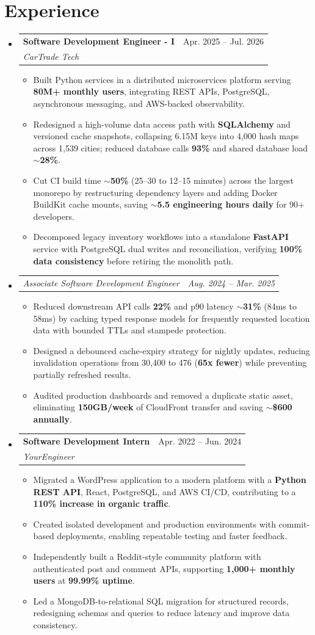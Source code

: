\documentclass[letterpaper,11pt]{article}
\makeatletter
\newcommand{\resumeItem}[1]{
  \item\small{
    {#1 \vspace{-2pt}}
  }
}
\newcommand{\resumeSubheading}[4]{
  \vspace{-2pt}\item
    \begin{tabular*}{0.97\textwidth}[t]{l@{\extracolsep{\fill}}r}
      \textbf{#1} & #2 \\
      \textit{\small#3} & \textit{\small #4} \\
    \end{tabular*}\vspace{-7pt}
}
\newcommand{\resumeSubSubheading}[2]{
    \item
    \begin{tabular*}{0.97\textwidth}{l@{\extracolsep{\fill}}r}
      \textit{\small#1} & \textit{\small #2} \\
    \end{tabular*}\vspace{-7pt}
}
\newcommand{\resumeSubHeadingListStart}{\begin{itemize}[leftmargin=0.15in, label={}]}
\newcommand{\resumeSubHeadingListEnd}{\end{itemize}}
\newcommand{\resumeItemListStart}{\begin{itemize}}
\newcommand{\resumeItemListEnd}{\end{itemize}\vspace{-5pt}}
\makeatother
\begin{document}
\section{Experience}
\resumeSubHeadingListStart
\resumeSubheading
{Software Development Engineer - I}{Apr. 2025 -- Jul. 2026}
{CarTrade Tech}{ }
\resumeItemListStart
\resumeItem{Built Python services in a distributed microservices platform serving \textbf{80M+ monthly users}, integrating REST APIs, PostgreSQL, asynchronous messaging, and AWS-backed observability.}
\resumeItem{Redesigned a high-volume data access path with \textbf{SQLAlchemy} and versioned cache snapshots, collapsing 6.15M keys into 4,000 hash maps across 1,539 cities; reduced database calls \textbf{93\%} and shared database load \textbf{$\sim$28\%}.}
\resumeItem{Cut CI build time \textbf{$\sim$50\%} (25--30 to 12--15 minutes) across the largest monorepo by restructuring dependency layers and adding Docker BuildKit cache mounts, saving \textbf{$\sim$5.5 engineering hours daily} for 90+ developers.}
\resumeItem{Decomposed legacy inventory workflows into a standalone \textbf{FastAPI} service with PostgreSQL dual writes and reconciliation, verifying \textbf{100\% data consistency} before retiring the monolith path.}
\resumeItemListEnd
\resumeSubSubheading
{Associate Software Development Engineer}{Aug. 2024 -- Mar. 2025}
\resumeItemListStart
\resumeItem{Reduced downstream API calls \textbf{22\%} and p90 latency \textbf{$\sim$31\%} (84ms to 58ms) by caching typed response models for frequently requested location data with bounded TTLs and stampede protection.}
\resumeItem{Designed a debounced cache-expiry strategy for nightly updates, reducing invalidation operations from 30,400 to 476 (\textbf{65x fewer}) while preventing partially refreshed results.}
\resumeItem{Audited production dashboards and removed a duplicate static asset, eliminating \textbf{150GB/week} of CloudFront transfer and saving \textbf{$\sim$\$600 annually}.}
\resumeItemListEnd
\resumeSubheading
{Software Development Intern}{Apr. 2022 -- Jun. 2024}
{YourEngineer}{ }
\resumeItemListStart
\resumeItem{Migrated a WordPress application to a modern platform with a \textbf{Python REST API}, React, PostgreSQL, and AWS CI/CD, contributing to a \textbf{110\% increase in organic traffic}.}
\resumeItem{Created isolated development and production environments with commit-based deployments, enabling repeatable testing and faster feedback.}
\resumeItem{Independently built a Reddit-style community platform with authenticated post and comment APIs, supporting \textbf{1,000+ monthly users} at \textbf{99.99\% uptime}.}
\resumeItem{Led a MongoDB-to-relational SQL migration for structured records, redesigning schemas and queries to reduce latency and improve data consistency.}
\resumeItemListEnd
\resumeSubHeadingListEnd
\end{document}
